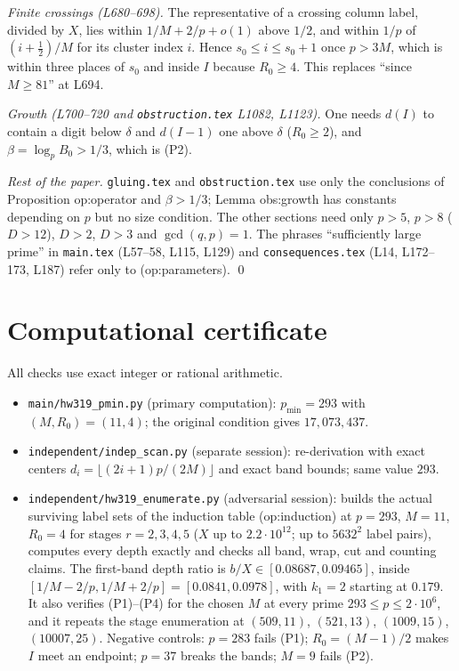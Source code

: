 \documentclass[11pt]{amsart}
\theoremstyle{remark}
\begin{document}
\emph{Finite crossings (L680--698).} The representative of a crossing column label, divided by $X$,
lies within $1/M+2/p+o(1)$ above $1/2$, and within $1/p$ of $(i+\tfrac12)/M$ for its
cluster index $i$. Hence $s_0\le i\le s_0+1$ once $p>3M$, which is within three places of $s_0$
and inside $I$ because $R_0\ge4$. This replaces ``since $M\ge81$'' at L694.

\emph{Growth (L700--720 and \texttt{obstruction.tex} L1082, L1123).} One needs
$d(I)$ to contain a digit below $\delta$ and $d(I-1)$ one above $\delta$ ($R_0\ge2$), and
$\beta=\log_pB_0>1/3$, which is (P2).

\emph{Rest of the paper.} \texttt{gluing.tex} and \texttt{obstruction.tex} use only the conclusions of
Proposition op:operator and $\beta>1/3$; Lemma obs:growth has constants depending on $p$
but no size condition. The other sections need only $p>5$, $p>8$ ($D>12$), $D>2$, $D>3$
and $\gcd(q,p)=1$. The phrases ``sufficiently large prime'' in \texttt{main.tex}
(L57--58, L115, L129) and \texttt{consequences.tex} (L14, L172--173, L187) refer only to
(op:parameters). \qed

\section{Computational certificate}
All checks use exact integer or rational arithmetic.
\begin{itemize}
\item \texttt{main/hw319\_pmin.py} (primary computation): $p_{\min}=293$ with $(M,R_0)=(11,4)$;
the original condition gives $17{,}073{,}437$.
\item \texttt{independent/indep\_scan.py} (separate session): re-derivation with exact centers
$d_i=\lfloor(2i+1)p/(2M)\rfloor$ and exact band bounds; same value $293$.
\item \texttt{independent/hw319\_enumerate.py} (adversarial session): builds the actual surviving
label sets of the induction table (op:induction) at $p=293$, $M=11$, $R_0=4$ for stages
$r=2,3,4,5$ ($X$ up to $2.2\cdot10^{12}$; up to $5632^2$ label pairs), computes every depth exactly
and checks all band, wrap, cut and counting claims. The first-band depth ratio is
$b/X\in[0.08687,0.09465]$, inside $[1/M-2/p,1/M+2/p]=[0.0841,0.0978]$, with $k_1=2$ starting
at $0.179$. It also verifies (P1)--(P4) for the chosen $M$ at every prime $293\le p\le 2\cdot10^6$,
and it repeats the stage enumeration at $(509,11)$, $(521,13)$, $(1009,15)$, $(10007,25)$. Negative controls: $p=283$
fails (P1); $R_0=(M-1)/2$ makes $I$ meet an endpoint; $p=37$ breaks the bands; $M=9$ fails (P2).
\end{itemize}
\end{document}
